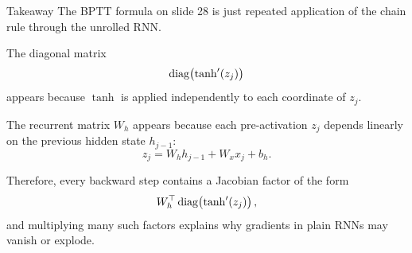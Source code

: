 \documentclass[aspectratio=169]{beamer}
\begin{document}
\begin{frame}{Takeaway}
\small
The BPTT formula on slide 28 is just repeated application of the chain rule through the unrolled RNN.

\vspace{0.25cm}
The diagonal matrix
\[
\operatorname{diag}\!\left(\tanh'(z_j)\right)
\]
appears because $\tanh$ is applied independently to each coordinate of $z_j$.

\vspace{0.25cm}
The recurrent matrix $W_h$ appears because each pre-activation $z_j$ depends linearly on the previous hidden state $h_{j-1}$:
\[
z_j = W_h h_{j-1} + W_x x_j + b_h.
\]

\vspace{0.25cm}
Therefore, every backward step contains a Jacobian factor of the form
\[
W_h^{\top}\operatorname{diag}\!\left(\tanh'(z_j)\right),
\]
and multiplying many such factors explains why gradients in plain RNNs may vanish or explode.
\end{frame}
%
\end{document}

